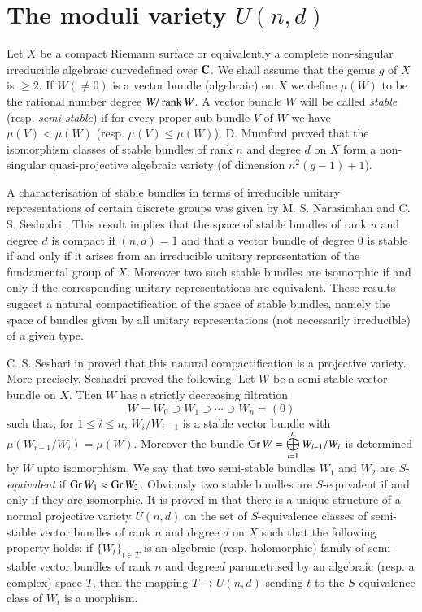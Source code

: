\section{The moduli variety $U(n,d)$}\label{art17-sec2}

Let $X$ be a compact Riemann surface or equivalently a complete non-singular irreducible algebraic curve\pageoriginale defined over $\mathbf{C}$. We shall assume that the genus $g$ of $X$ is $\geq 2$. If $W(\neq 0)$ is a vector bundle (algebraic) on $X$ we define $\mu(W)$ to be the rational number degree $W/\operatorname{\mathrm{rank}} W$. A vector bundle $W$ will be called {\em stable} (resp. {\em semi-stable}) if for every proper sub-bundle $V$ of $W$ we have $\mu(V)<\mu(W)$ (resp. $\mu(V)\leq \mu(W)$). D. Mumford proved that the isomorphism classes of stable bundles of rank $n$ and degree $d$ on $X$ form a non-singular quasi-projective algebraic variety (of dimension $n^{2}(g-1)+1$).

A characterisation of stable bundles in terms of irreducible unitary representations of certain discrete groups was given by M. S. Narasimhan and C. S. Seshadri \cite{art17-cite4}. This result implies that the space of stable bundles of rank $n$ and degree $d$ is compact if $(n,d)=1$ and that a vector bundle of degree 0 is stable if and only if it arises from an irreducible unitary representation of the fundamental group of $X$. Moreover two such stable bundles are isomorphic if and only if the corresponding unitary representations are equivalent. These results suggest a natural compactification of the space of stable bundles, namely the space of bundles given by all unitary representations (not necessarily irreducible) of a given type.

C. S. Seshari in \cite{art17-key7} proved that this natural compactification is a projective variety. More precisely, Seshadri proved the following. Let $W$ be a semi-stable vector bundle on $X$. Then $W$ has a strictly decreasing filtration
$$
W=W_{0}\supset W_{1}\supset \cdots \supset W_{n}=(0)
$$
such that, for $1\leq i\leq n$, $W_{i}/W_{i-1}$ is a stable vector bundle with $\mu(W_{i-1}/W_{i})=\mu(W)$. Moreover the bundle $\operatorname{\mathrm{Gr}} W=\bigoplus\limits^{n}_{i=1}W_{i-1}/W_{i}$ is determined by $W$ upto isomorphism. We say that two semi-stable bundles $W_{1}$ and $W_{2}$ are $S$-{\em equivalent} if $\operatorname{\mathrm{Gr}} W_{1}\approx \operatorname{\mathrm{Gr}} W_{2}$. Obviously two stable bundles are $S$-equivalent if and only if they are isomorphic. It is proved in \cite{art17-key7} that there is a unique structure of a normal projective variety $U(n,d)$ on the set of $S$-equivalence classes of semi-stable vector bundles of rank $n$ and degree $d$ on $X$ such that the following property holds: if $\{W_{t}\}_{t\in T}$ is an algebraic (resp. holomorphic) family of semi-stable vector bundles of rank $n$ and degree\pageoriginale $d$ parametrised by an algebraic (resp. a complex) space $T$, then the mapping $T\to U(n,d)$ sending $t$ to the $S$-equivalence class of $W_{t}$ is a morphism.

